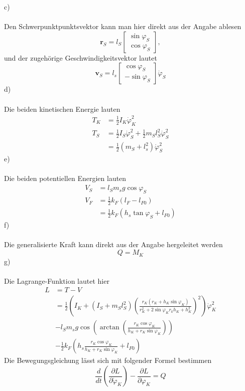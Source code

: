 c) \\ \\
Den Schwerpunktpunktsvektor kann man hier direkt aus der Angabe ablesen
\[
	\textbf{r}_S = l_S \begin{bmatrix}
		\sin\varphi_S \\
		\cos\varphi_S
	\end{bmatrix},
\]
und der zugehörige Geschwindigkeitsvektor lautet
\[
	\textbf{v}_S = l_s\begin{bmatrix}
		\cos\varphi_S \\
		-\sin\varphi_S
	\end{bmatrix}
	\dot{\varphi}_S
\]
d) \\ \\
Die beiden kinetischen Energie lauten
\begin{align*}
	T_K &= \frac{1}{2} I_K \dot{\varphi}_K^2 \\
	T_S &= \frac{1}{2}I_S\dot{\varphi}_S^2 + \frac{1}{2}m_Sl_S^2\dot{\varphi}_S^2 \\
	    &= \frac{1}{2}(m_S + l_s^2)\dot{\varphi}_S^2
\end{align*}
e)\\ \\
Die beiden potentiellen Energien lauten
\begin{align*}
	V_S &= l_Sm_sg\cos\varphi_S \\
	V_F &= \frac{1}{2}k_F(l_F - l_{F0}) \\
	    &= \frac{1}{2}k_F(h_s\tan\varphi_S + l_{F0})
\end{align*}
f) \\ \\
Die generalisierte Kraft kann direkt aus der Angabe hergeleitet werden
\[
	Q = M_K
\]
g)\\ \\
Die Lagrange-Funktion lautet hier
\begin{align*}
	L &= T - V \\
	  &= \frac{1}{2}\left(I_K +(I_S + m_Sl_S^2)\left( \frac{r_K(r_K + h_K\sin\varphi_K)}{r_K^2 + 2\sin\varphi_Kr_kh_K + h_K^2}\right)^2\right)\dot{\varphi}_K^2 \\
	  &- l_Sm_sg\cos\left( \arctan\left( \frac{r_K\cos\varphi_K}{h_K + r_K\sin\varphi_K}\right)\right) \\
	  &- \frac{1}{2}k_F\left(h_s \frac{r_K\cos\varphi_K}{h_K + r_K\sin\varphi_K} + l_{F0}\right)
\end{align*}
Die Bewegungsgleichung lässt sich mit folgender Formel bestimmen
\[
	\frac{d}{dt}\left(\frac{\partial L}{\partial \dot{\varphi}_K}\right) - \frac{\partial L}{\partial \varphi_K} = Q
\]